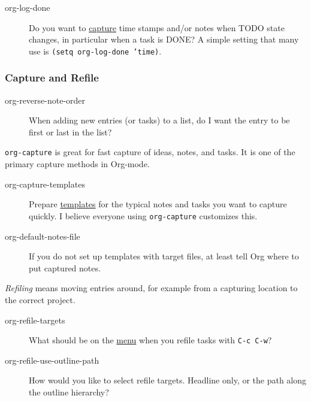 \documentclass[11pt]{article}
\begin{document}

\begin{description}
\item[{org-log-done}] Do you want to \href{http://orgmode.org/manual/Progress-logging.html\#Progress-logging}{capture} time stamps and/or notes when
TODO state changes, in particular when a task is DONE?  A simple
setting that many use is \texttt{(setq org-log-done 'time)}.
\end{description}

\subsubsection*{Capture and Refile}
\label{sec:orgfdca395}


\begin{description}
\item[{org-reverse-note-order}] When adding new entries (or tasks) to a
list, do I want the entry to be first or last in the list?
\end{description}

\texttt{org-capture} is great for fast capture of ideas, notes, and tasks.  It
is one of the primary capture methods in Org-mode.

\begin{description}
\item[{org-capture-templates}] Prepare \href{http://orgmode.org/manual/Remember-templates.html\#Remember-templates}{templates} for the typical notes and
tasks you want to capture quickly.  I believe everyone using
\texttt{org-capture} customizes this.

\item[{org-default-notes-file}] If you do not set up templates with target
files, at least tell Org where to put captured notes.
\end{description}

\emph{Refiling} means moving entries around, for example from a capturing
location to the correct project.

\begin{description}
\item[{org-refile-targets}] What should be on the \href{http://orgmode.org/manual/Refiling-notes.html\#Refiling-notes}{menu} when you refile
tasks with \texttt{C-c C-w}?

\item[{org-refile-use-outline-path}] How would you like to select refile
targets. Headline only, or the path along the outline hierarchy?
\end{description}
\end{document}
